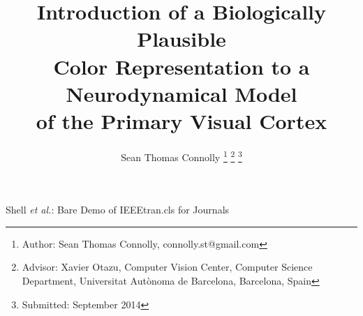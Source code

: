\documentclass[journal,onecolumn]{IEEEtran}
\begin{document}
\title{Introduction of a Biologically Plausible \\ Color Representation to a Neurodynamical Model \\ of the Primary Visual Cortex}
%
%
%

\author{Sean Thomas Connolly%
\thanks{Author: Sean Thomas Connolly, connolly.st@gmail.com}%
\thanks{Advisor: Xavier Otazu,  Computer Vision Center, Computer Science Department, Universitat Autònoma de Barcelona, Barcelona, Spain }%
\thanks{Submitted: September 2014}}

% 
%



%
{Shell \MakeLowercase{\textit{et al.}}: Bare Demo of IEEEtran.cls for Journals}



\maketitle
\end{document}
